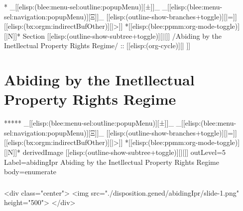 
\begin{whenOrg}
*  _[[elisp:(blee:menu-sel:outline:popupMenu)][±]]_ _[[elisp:(blee:menu-sel:navigation:popupMenu)][Ξ]]_ [[elisp:(outline-show-branches+toggle)][|=]] [[elisp:(bx:orgm:indirectBufOther)][|>]] *[[elisp:(blee:ppmm:org-mode-toggle)][|N]]*  Section    [[elisp:(outline-show-subtree+toggle)][||]]   /Abiding by the Inetllectual Property Rights Regime/ ::  [[elisp:(org-cycle)][| ]]
\end{whenOrg}

\section{Abiding by the Inetllectual Property Rights Regime}


\begin{whenOrg}
*****  _[[elisp:(blee:menu-sel:outline:popupMenu)][±]]_ _[[elisp:(blee:menu-sel:navigation:popupMenu)][Ξ]]_ [[elisp:(outline-show-branches+toggle)][|=]] [[elisp:(bx:orgm:indirectBufOther)][|>]] *[[elisp:(blee:ppmm:org-mode-toggle)][|N]]*  derivedImage [[elisp:(outline-show-subtree+toggle)][||]] outLevel=5 Label=abidingIpr Abiding by the Inetllectual Property Rights Regime body=enumerate
\end{whenOrg}

\begin{htmlonly}

\begin{frame}[fragile,plain,label=abidingIpr]
    \frametitle{}
    \framesubtitle{}
    \begin{rawhtml}
<div class="center">
<img src="./disposition.gened/abidingIpr/slide-1.png" height="500">
</div>
    \end{rawhtml}
\end{frame}
\end{htmlonly}


